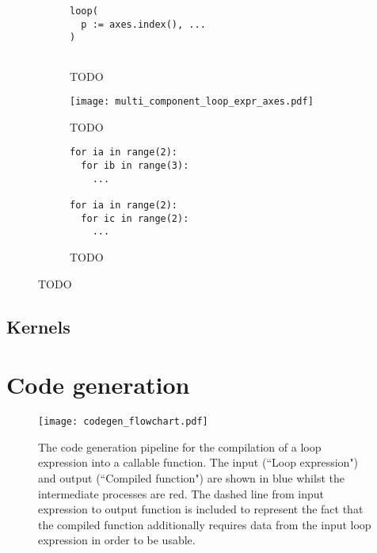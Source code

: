 \documentclass[thesis]{subfiles}
\begin{document}
\begin{figure}[h]
  \centering

  \begin{subfigure}[t]{.32\textwidth}
    \centering
    \begin{verbatim}
loop(
  p := axes.index(), ...
)


    \end{verbatim}
    \caption{TODO}
    \label{fig:multi_component_loop_expr_init}
  \end{subfigure}
  \begin{subfigure}[t]{.32\textwidth}
    \centering
    \texttt{[image: multi\_component\_loop\_expr\_axes.pdf]}
    \caption{TODO}
    \label{fig:multi_component_loop_expr_axes}
  \end{subfigure}
  \begin{subfigure}[t]{.32\textwidth}
    \centering
    \begin{verbatim}
for ia in range(2):
  for ib in range(3):
    ...

for ia in range(2):
  for ic in range(2):
    ...
    \end{verbatim}
    \caption{TODO}
    \label{fig:multi_component_loop_expr_codegen}
  \end{subfigure}

  \caption{TODO}
  \label{fig:multi_component_loop_expr}
\end{figure}

\subsection{Kernels}


\section{Code generation}
\label{sec:codegen}

\begin{figure}[h]
  \centering
  \texttt{[image: codegen\_flowchart.pdf]}
  \caption{
    The code generation pipeline for the compilation of a loop expression into a callable function.
    The input (``Loop expression") and output (``Compiled function") are shown in blue whilst the intermediate processes are red.
    The dashed line from input expression to output function is included to represent the fact that the compiled function additionally requires data from the input loop expression in order to be usable.
  }
  \label{fig:codegen_flowchart}
\end{figure}
\end{document}

